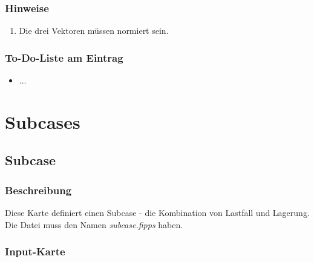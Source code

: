 \documentclass[11pt,titlepage,listof=totoc,bibliography=totoc,twoside]{scrreprt}
\begin{document}
{{\subsubsection{Hinweise}

\begin{enumerate}
\item Die drei Vektoren müssen normiert sein.
\end{enumerate}

\subsubsection{To-Do-Liste am Eintrag}

\begin{itemize}
\item ...
\end{itemize}

\newpage

\section{Subcases}
\label{sec:subcase}

\subsection{Subcase}

\subsubsection{Beschreibung}

Diese Karte definiert einen Subcase - die Kombination von Lastfall und Lagerung.\\
Die Datei muss den Namen \emph{subcase.fipps} haben.

\subsubsection{Input-Karte}

}}
\end{document}
